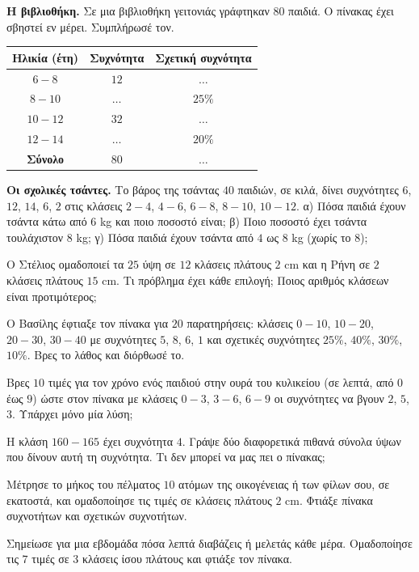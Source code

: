\ex \textbf{Η βιβλιοθήκη.} Σε μια βιβλιοθήκη γειτονιάς γράφτηκαν $80$ παιδιά. Ο πίνακας έχει σβηστεί εν μέρει. Συμπλήρωσέ τον.
\begin{center}
\renewcommand{\arraystretch}{1.2}
\begin{tabular}{ccc}
\toprule
\textbf{Ηλικία (έτη)} & \textbf{Συχνότητα} & \textbf{Σχετική συχνότητα}\\
\midrule
$6-8$ & $12$ & $\ldots$\\
$8-10$ & $\ldots$ & $25\%$\\
$10-12$ & $32$ & $\ldots$\\
$12-14$ & $\ldots$ & $20\%$\\
\midrule
\textbf{Σύνολο} & $80$ & $\ldots$\\
\bottomrule
\end{tabular}
\end{center}

\ex \textbf{Οι σχολικές τσάντες.} Το βάρος της τσάντας $40$ παιδιών, σε κιλά, δίνει συχνότητες $6$, $12$, $14$, $6$, $2$ στις κλάσεις $2-4$, $4-6$, $6-8$, $8-10$, $10-12$. α) Πόσα παιδιά έχουν τσάντα κάτω από $6$ kg και ποιο ποσοστό είναι; β) Ποιο ποσοστό έχει τσάντα τουλάχιστον $8$ kg; γ) Πόσα παιδιά έχουν τσάντα από $4$ ως $8$ kg (χωρίς το $8$);


\ex Ο Στέλιος ομαδοποιεί τα $25$ ύψη σε $12$ κλάσεις πλάτους $2$ cm και η Ρήνη σε $2$ κλάσεις πλάτους $15$ cm. Τι πρόβλημα έχει κάθε επιλογή; Ποιος αριθμός κλάσεων είναι προτιμότερος;

\ex Ο Βασίλης έφτιαξε τον πίνακα για $20$ παρατηρήσεις: κλάσεις $0-10$, $10-20$, $20-30$, $30-40$ με συχνότητες $5$, $8$, $6$, $1$ και σχετικές συχνότητες $25\%$, $40\%$, $30\%$, $10\%$. Βρες το λάθος και διόρθωσέ το.

\ex Βρες $10$ τιμές για τον χρόνο ενός παιδιού στην ουρά του κυλικείου (σε λεπτά, από $0$ έως $9$) ώστε στον πίνακα με κλάσεις $0-3$, $3-6$, $6-9$ οι συχνότητες να βγουν $2$, $5$, $3$. Υπάρχει μόνο μία λύση;

\ex Η κλάση $160-165$ έχει συχνότητα $4$. Γράψε δύο διαφορετικά πιθανά σύνολα ύψων που δίνουν αυτή τη συχνότητα. Τι δεν μπορεί να μας πει ο πίνακας;


\ex Μέτρησε το μήκος του πέλματος $10$ ατόμων της οικογένειας ή των φίλων σου, σε εκατοστά, και ομαδοποίησε τις τιμές σε κλάσεις πλάτους $2$ cm. Φτιάξε πίνακα συχνοτήτων και σχετικών συχνοτήτων.

\ex Σημείωσε για μια εβδομάδα πόσα λεπτά διαβάζεις ή μελετάς κάθε μέρα. Ομαδοποίησε τις $7$ τιμές σε $3$ κλάσεις ίσου πλάτους και φτιάξε τον πίνακα.
